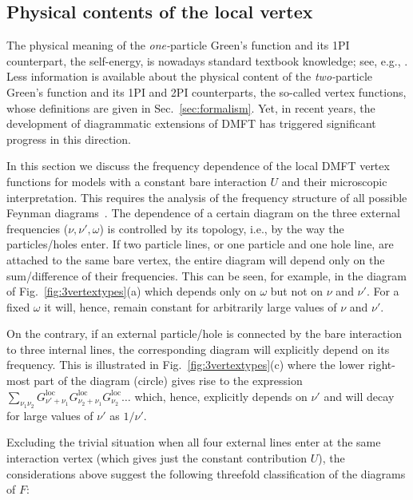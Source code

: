 \documentclass[rmp,aps,reprint,amsmath,amssymb,superscriptaddress,showpacs,nofootinbib]{revtex4-1}
\begin{document}
\subsection{Physical contents of the local vertex}
\label{sec:vertexphysics}

The physical meaning of the {\sl one-}particle Green's function and its 1PI counterpart, the self-energy, is nowadays standard textbook knowledge; see, e.g., . Less information is available about the physical content of the {\sl two-}particle Green's function and its 1PI and 2PI counterparts, the so-called vertex functions, whose definitions are given in Sec.~\ref{sec:formalism}. Yet, in recent years, the development of diagrammatic extensions of DMFT has triggered significant progress in this direction.
  
In this section we discuss the frequency dependence of the local DMFT vertex functions for models with a constant bare interaction $U$ and their microscopic interpretation. This requires the analysis of the frequency structure of all possible Feynman diagrams~\cite{Rohringer2012,Rohringer2013a,Wentzell2016}. The dependence of a certain diagram on the three external frequencies ($\nu,\nu',\omega$) is controlled by its topology, i.e., by the way the particles/holes enter. If two particle lines, or one particle and one hole line, are attached to the same bare vertex, the entire diagram will depend only on the sum/difference of their frequencies. This can be seen, for example, in the diagram of Fig.~\ref{fig:3vertextypes}(a) which depends only on $\omega$ but not on $\nu$ and $\nu'$. For a fixed $\omega$ it will, hence, remain constant for arbitrarily large values of $\nu$ and $\nu'$.

On the contrary, if an external particle/hole is connected by the bare interaction to three internal lines, the corresponding diagram will explicitly depend on its frequency. This is illustrated in Fig.~\ref{fig:3vertextypes}(c) where the lower right-most part of the diagram (circle) gives rise to the expression $\sum_{\nu_1\nu_2}G^{\text{loc}}_{\nu'+\nu_1}G^{\text{loc}}_{\nu_2+\nu_1}G^{\text{loc}}_{\nu_2}\ldots$ which, hence, explicitly depends on $\nu'$ and will decay for large values of $\nu'$ as $1/\nu'$.   

Excluding the trivial situation when all four external lines enter at the same interaction vertex (which gives just the constant contribution $U$), the considerations above suggest the following threefold classification of the diagrams of $F$:
\end{document}
